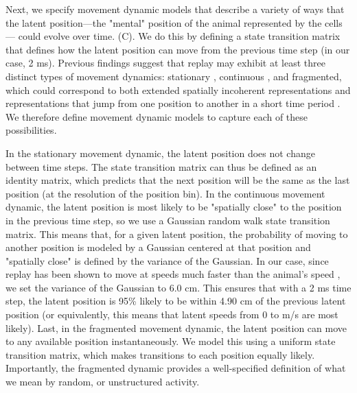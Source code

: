 \documentclass[9pt,lineno]{elife}
\begin{document}
Next, we specify movement dynamic models that describe a variety of ways that the latent position---the "mental" position of the animal represented by the cells--- could evolve over time. (C). We do this by defining a state transition matrix that defines how the latent position can move from the previous time step (in our case, 2 ms). Previous findings suggest that replay may exhibit at least three distinct types of movement dynamics: stationary \citep{YuDistincthippocampalcorticalmemory2017, FarooqEmergencepreconfiguredplastic2019}, continuous \citep{DavidsonHippocampalReplayExtended2009}, and fragmented, which could correspond to both extended spatially incoherent representations and representations that jump from one position to another in a short time period \citep{PfeifferAutoassociativedynamicsgeneration2015}. We therefore define movement dynamic models to capture each of these possibilities.

In the stationary movement dynamic, the latent position does not change between time steps. The state transition matrix can thus be defined as an identity matrix, which predicts that the next position will be the same as the last position (at the resolution of the position bin). In the continuous movement dynamic, the latent position is most likely to be "spatially close" to the position in the previous time step, so we use a Gaussian random walk state transition matrix. This means that, for a given latent position, the probability of moving to another position is modeled by a Gaussian centered at that position and "spatially close" is defined by the variance of the Gaussian. In our case, since replay has been shown to move at speeds much faster than the animal's speed \citep{DavidsonHippocampalReplayExtended2009, PfeifferAutoassociativedynamicsgeneration2015}, we set the variance of the Gaussian to 6.0 cm. This ensures that with a 2 ms time step, the latent position is 95\% likely to be within 4.90 cm of the previous latent position (or equivalently, this means that latent speeds from 0 to  m/s are most likely). Last, in the fragmented movement dynamic, the latent position can move to any available position instantaneously. We model this using a uniform state transition matrix, which makes transitions to each position equally likely. Importantly, the fragmented dynamic provides a well-specified definition of what we mean by random, or unstructured activity.
\end{document}
